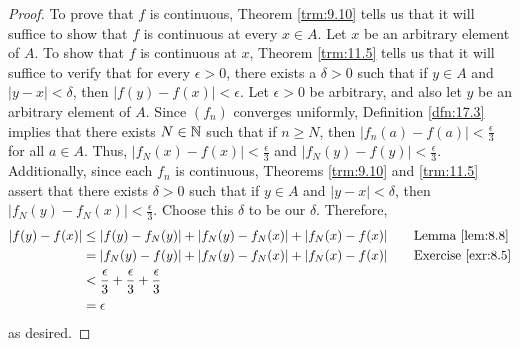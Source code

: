\documentclass[../main.tex]{subfiles}
\begin{document}
\begin{theorem}
\begin{proof}
        To prove that $f$ is continuous, Theorem \ref{trm:9.10} tells us that it will suffice to show that $f$ is continuous at every $x\in A$. Let $x$ be an arbitrary element of $A$. To show that $f$ is continuous at $x$, Theorem \ref{trm:11.5} tells us that it will suffice to verify that for every $\epsilon>0$, there exists a $\delta>0$ such that if $y\in A$ and $|y-x|<\delta$, then $|f(y)-f(x)|<\epsilon$. Let $\epsilon>0$ be arbitrary, and also let $y$ be an arbitrary element of $A$. Since $(f_n)$ converges uniformly, Definition \ref{dfn:17.3} implies that there exists $N\in\mathbb{N}$ such that if $n\geq N$, then $|f_n(a)-f(a)|<\frac{\epsilon}{3}$ for all $a\in A$. Thus, $|f_N(x)-f(x)|<\frac{\epsilon}{3}$ and $|f_N(y)-f(y)|<\frac{\epsilon}{3}$. Additionally, since each $f_n$ is continuous, Theorems \ref{trm:9.10} and \ref{trm:11.5} assert that there exists $\delta>0$ such that if $y\in A$ and $|y-x|<\delta$, then $|f_N(y)-f_N(x)|<\frac{\epsilon}{3}$. Choose this $\delta$ to be our $\delta$. Therefore,
        \begin{align*}
            |f(y)-f(x)| &\leq |f(y)-f_N(y)|+|f_N(y)-f_N(x)|+|f_N(x)-f(x)|\tag*{Lemma \ref{lem:8.8}}\\
            &= |f_N(y)-f(y)|+|f_N(y)-f_N(x)|+|f_N(x)-f(x)|\tag*{Exercise \ref{exr:8.5}}\\
            &< \frac{\epsilon}{3}+\frac{\epsilon}{3}+\frac{\epsilon}{3}\\
            &= \epsilon
        \end{align*}
        as desired.
    \end{proof}
\end{theorem}
\end{document}
